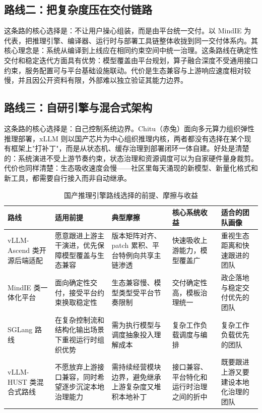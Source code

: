 \subsection{路线二：把复杂度压在交付链路}

这条路的核心选择是：不让用户操心组装，而是由平台统一交付。以 MindIE 为代表，把推理引擎、编译器、运行时与部署工具链整体收拢到同一交付体系内\citep{mindie,huawei_mindie_2026}。其核心理念是：系统从编译到上线应在相同约束空间中统一治理。这条路线在确定性交付和稳定迭代方面具有优势：模型覆盖由平台规划，算子融合深度不受通用接口约束，服务配置可与平台基础设施联动。代价是生态兼容与上游响应速度相对较慢，并且因公开资料有限，外部难以独立验证其能力边界。

\subsection{路线三：自研引擎与混合式架构}

这条路的核心选择是：自己控制系统边界。Chitu（赤兔）面向多元算力组织弹性推理部署，xLLM 则以国产芯片为中心组织推理内核，两者都没有选择在某个现有框架上"打补丁"，而是从状态机、缓存治理到部署闭环一体自建\citep{chitu_github,xllm_docs,xllm_tech_report}。好处是清楚的：系统演进不受上游节奏约束，状态治理和资源调度可以为自家硬件量身裁剪。代价也同样清楚：生态吸收速度会慢——社区里每天涌现的新模型、新量化格式和新工具，都需要自行接入而非自动继承。

\begin{table}[t]
\centering
\footnotesize
\setlength{\tabcolsep}{4pt}
\caption{国产推理引擎路线选择的前提、摩擦与收益}
\label{tab:community-route-selection}
\begin{tabularx}{\textwidth}{L{2.2cm}L{3.5cm}L{3.5cm}L{3.0cm}Y}
\toprule
路线 & 适用前提 & 典型摩擦 & 核心系统收益 & 适合的团队画像 \\
\midrule
vLLM-Ascend 类开源后端适配 & 愿意跟进上游主干演进，优先保障模型覆盖与生态兼容 & 版本矩阵对齐、patch 累积、平台特例向共享主链渗透\citep{vllmascend} & 快速吸收上游能力，模型覆盖广 & 重视生态距离和快速跟进的团队 \\
MindIE 类一体化平台 & 面向确定性交付，接受平台约束换取稳定性 & 生态兼容慢、模型类型受平台节奏限制\citep{mindie} & 交付确定性高，模板治理统一 & 政企落地与稳定交付优先的团队 \\
SGLang 路线 & 在复杂控制流和结构化输出场景下重视运行时组织优势 & 需为执行模型与调度抽象投入理解成本\citep{sglang,sglangpaper} & 复杂工作负载调度与编排 & 复杂工作负载优先的团队 \\
vLLM-HUST 类混合式路线 & 不愿放弃上游接口兼容，同时希望逐步沉淀本地治理能力 & 需持续经营模块边界，避免继承上游复杂度又堆积本地补丁\citep{vllmhust} & 接口兼容、平台特化和运行时治理之间的折中 & 既要跟进上游又要建设本地化治理的团队 \\
\bottomrule
\end{tabularx}
\end{table}

